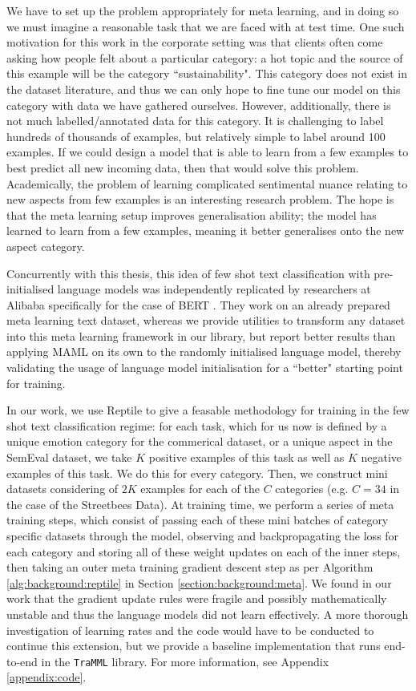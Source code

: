 We have to set up the problem appropriately for meta learning, and in doing so we must imagine a reasonable task that we are faced with at test time. One such motivation for this work in the corporate setting was that clients often come asking how people felt about a particular category: a hot topic and the source of this example will be the category ``sustainability". This category does not exist in the dataset literature, and thus we can only hope to fine tune our model on this category with data we have gathered ourselves. However, additionally, there is not much labelled/annotated data for this category. It is challenging to label hundreds of thousands of examples, but relatively simple to label around 100 examples. If we could design a model that is able to learn from a few examples to best predict all new incoming data, then that would solve this problem. Academically, the problem of learning complicated sentimental nuance relating to new aspects from few examples is an interesting research problem. The hope is that the meta learning setup improves generalisation ability; the model has learned to learn from a few examples, meaning it better generalises onto the new aspect category. 

Concurrently with this thesis, this idea of few shot text classification with pre-initialised language models was independently replicated by researchers at Alibaba specifically for the case of BERT \cite{Zhang2019}. They work on an already prepared meta learning text dataset, whereas we provide utilities to transform any dataset into this meta learning framework in our library, but report better results than applying MAML on its own to the randomly initialised language model, thereby validating the usage of language model initialisation for a ``better" starting point for training.

In our work, we use Reptile \cite{Nichol} to give a feasable methodology for training in the few shot text classification regime: for each task, which for us now is defined by a unique emotion category for the commerical dataset, or a unique aspect in the SemEval dataset, we take $K$ positive examples of this task as well as $K$ negative examples of this task. We do this for every category. Then, we construct mini datasets considering of $2K$ examples for each of the $C$ categories (e.g. $C=34$ in the case of the Streetbees Data). At training time, we perform a series of meta training steps, which consist of passing each of these mini batches of category specific datasets through the model, observing and backpropagating the loss for each category and storing all of these weight updates on each of the inner steps, then taking an outer meta training gradient descent step as per Algorithm \ref{alg:background:reptile} in Section \ref{section:background:meta}. We found in our work that the gradient update rules were fragile and possibly mathematically unstable and thus the language models did not learn effectively. A more thorough investigation of learning rates and the code would have to be conducted to continue this extension, but we provide a baseline implementation that runs end-to-end in the \texttt{TraMML} library. For more information, see Appendix \ref{appendix:code}.

